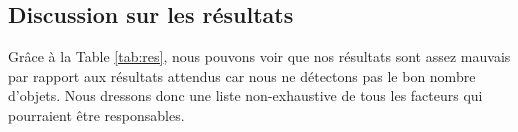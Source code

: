 \documentclass[10pt,a4paper]{article}
\begin{document}
   		\subsection{Discussion sur les résultats}
   		
   		Grâce à la Table \ref{tab:res}, nous pouvons voir que nos résultats sont assez mauvais par rapport aux résultats attendus car nous ne détectons pas le bon nombre d'objets. Nous dressons donc une liste non-exhaustive de tous les facteurs qui pourraient être responsables.
   		
   		

   		
   
          	
\end{document}
